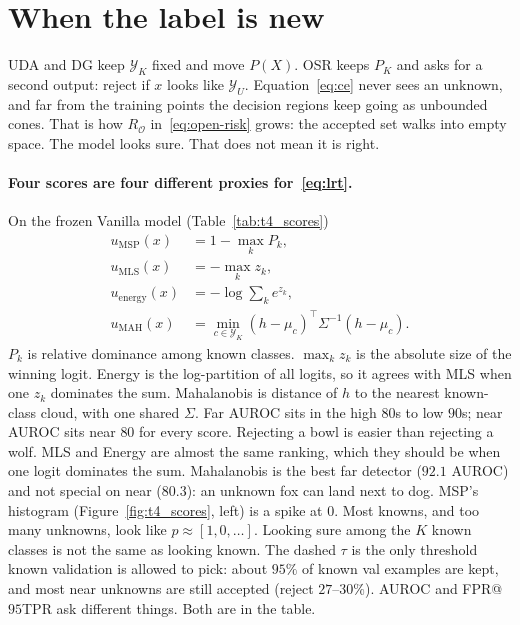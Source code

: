 \documentclass{article}
\begin{document}
\begin{table}[t]
  \centering
  \caption{Sketch per-class accuracy and change versus ERM.
  $n$ is the number of Sketch images.
  DAN sees unlabeled Sketch; DAN-DG and SAM do not.}
  \label{tab:t23_perclass}
  \small\setlength{\tabcolsep}{3.5pt}
  
\end{table}

\begin{table}[t]
  \centering
  \caption{Top Sketch confusions (true $\to$ predicted, count).}
  \label{tab:t23_confusions}
  \small
  
\end{table}

\section{When the label is new}
\label{sec:osr}

UDA and DG keep $\mathcal{Y}_K$ fixed and move $P(X)$.
OSR keeps $P_K$ and asks for a second output: reject if $x$ looks like $\mathcal{Y}_U$.
Equation~\eqref{eq:ce} never sees an unknown, and far from the training points the decision regions keep going as unbounded cones.
That is how $R_{\mathcal{O}}$ in~\eqref{eq:open-risk} grows: the accepted set walks into empty space.
The model looks sure. That does not mean it is right.

\paragraph{Four scores are four different proxies for~\eqref{eq:lrt}.}
On the frozen Vanilla model (Table~\ref{tab:t4_scores})
\begin{align}
  u_{\mathrm{MSP}}(x)&=1-\max_k P_k,
  \label{eq:msp}\\
  u_{\mathrm{MLS}}(x)&=-\max_k z_k,
  \label{eq:mls}\\
  u_{\mathrm{energy}}(x)&=-\log\sum_k e^{z_k},
  \label{eq:energy}\\
  u_{\mathrm{MAH}}(x)&=\min_{c\in\mathcal{Y}_K}(h-\mu_c)^\top\Sigma^{-1}(h-\mu_c).
  \label{eq:mah}
\end{align}
$P_k$ is relative dominance among known classes.
$\max_k z_k$ is the absolute size of the winning logit.
Energy is the log-partition of all logits, so it agrees with MLS when one $z_k$ dominates the sum.
Mahalanobis is distance of $h$ to the nearest known-class cloud, with one shared $\Sigma$.
Far AUROC sits in the high $80$s to low $90$s; near AUROC sits near $80$ for every score.
Rejecting a bowl is easier than rejecting a wolf.
MLS and Energy are almost the same ranking, which they should be when one logit dominates the sum.
Mahalanobis is the best far detector ($92.1$ AUROC) and not special on near ($80.3$): an unknown fox can land next to dog.
MSP's histogram (Figure~\ref{fig:t4_scores}, left) is a spike at $0$.
Most knowns, and too many unknowns, look like $p\approx[1,0,\ldots]$.
Looking sure among the $K$ known classes is not the same as looking known.
The dashed $\tau$ is the only threshold known validation is allowed to pick: about $95\%$ of known val examples are kept, and most near unknowns are still accepted (reject $27$--$30\%$).
AUROC and FPR@$95$TPR ask different things. Both are in the table.
\end{document}
